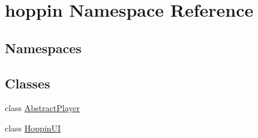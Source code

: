 \hypertarget{namespacehoppin}{}\section{hoppin Namespace Reference}
\label{namespacehoppin}
\subsection*{Namespaces}
\begin{DoxyCompactItemize}
\end{DoxyCompactItemize}
\subsection*{Classes}
\begin{DoxyCompactItemize}
\item 
class \hyperlink{classhoppin_1_1_abstract_player}{Abstract\+Player}
\item 
class \hyperlink{classhoppin_1_1_hoppin_u_i}{Hoppin\+UI}
\end{DoxyCompactItemize}
